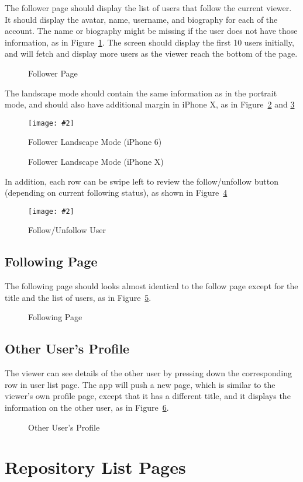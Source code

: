 \documentclass[12pt]{article}
\newcommand{\img}[3]{
\begin{figure}
\begin{center}
\texttt{[image: \#2]}
\caption{#3}\label{#2}
\end{center}
\end{figure}
}
\newcommand{\imgh}[4]{
    \begin{figure}[!htbp]%
    \begin{center}
    \subfloat{{\texttt{[image: \#2]} }}%
    \qquad
    \subfloat{{\texttt{[image: \#3]} }}%
    \caption{#4}\label{#2}
    \end{center}
\end{figure}
}
\begin{document}
The follower page should display the list of users that follow the current viewer. It should display the avatar, name, username, and biography for each of the account. The name or biography might be missing if the user does not have those information, as in Figure~\ref{follower}. The screen should display the first 10 users initially, and will fetch and display more users as the viewer reach the bottom of the page.

\imgh{0.45}{follower}{follower_iphoneX}{Follower Page}

The landscape mode should contain the same information as in the portrait mode, and should also have additional margin in iPhone X, as in Figure~\ref{landscape_follower} and \ref{landscape_follower_iphoneX}

\img{0.45}{landscape_follower}{Follower Landscape Mode (iPhone 6)}

\imgh{0.45}{landscape_follower_iphoneX}{landscape_follower_iphoneX_right}{Follower Landscape Mode (iPhone X)}

In addition, each row can be swipe left to review the follow/unfollow button (depending on current following status), as shown in Figure~\ref{user_list_buttons}

\img{0.45}{user_list_buttons}{Follow/Unfollow User}

\subsection{Following Page}

The following page should looks almost identical to the follow page except for the title and the list of users, as in Figure~\ref{following}.

\imgh{0.45}{following}{following_iphoneX}{Following Page}

\subsection{Other User's Profile}

The viewer can see details of the other user by pressing down the corresponding row in user list page. The app will push a new page, which is similar to the viewer's own profile page, except that it has a different title, and it displays the information on the other user, as in Figure~\ref{other_user}.

\imgh{0.45}{other_user}{other_user2}{Other User's Profile}


\section{Repository List Pages}
\end{document}
